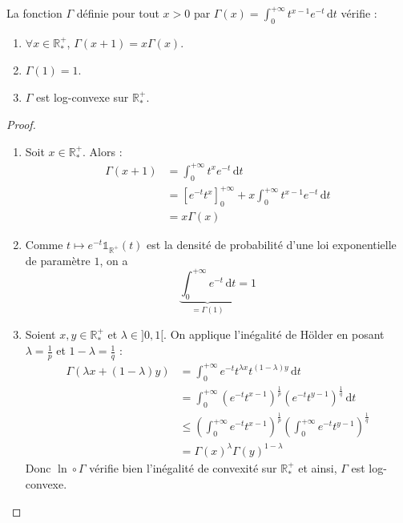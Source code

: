 






	\begin{lemma}
		\label{caracterisation-reelle-de-gamma-1}
		La fonction $\Gamma$ définie pour tout $x > 0$ par $\Gamma(x) = \int_0^{+\infty} t^{x-1} e^{-t} \, \mathrm{d}t$ vérifie :
		\begin{enumerate}[label=(\roman*)]
			\item \label{caracterisation-reelle-de-gamma-2} $\forall x \in \mathbb{R}^+_*$, $\Gamma(x+1) = x\Gamma(x)$.
			\item \label{caracterisation-reelle-de-gamma-3} $\Gamma(1) = 1$.
			\item \label{caracterisation-reelle-de-gamma-4} $\Gamma$ est log-convexe sur $\mathbb{R}^+_*$.
		\end{enumerate}
	\end{lemma}

	\begin{proof}
		\begin{enumerate}[label=(\roman*)]
			\item Soit $x \in \mathbb{R}^+_*$. Alors :
			\begin{align*}
				\Gamma(x+1) &= \int_0^{+\infty} t^x e^{-t} \, \mathrm{d}t \\
				&= \left[ e^{-t} t^x \right]_0^{+\infty} + x \int_0^{+\infty} t^{x-1} e^{-t} \, \mathrm{d}t \\
				&= x\Gamma(x)
			\end{align*}
			\item Comme $t \mapsto e^{-t} \mathbb{1}_{\mathbb{R}^+}(t)$ est la densité de probabilité d'une loi exponentielle de paramètre $1$, on a
			\[ \underbrace{\int_0^{+\infty} e^{-t} \, \mathrm{d}t}_{= \Gamma(1)} = 1 \]
			\item Soient $x, y \in \mathbb{R}^+_*$ et $\lambda \in ]0, 1[$. On applique l'inégalité de Hölder en posant $\lambda = \frac{1}{p}$ et $1-\lambda = \frac{1}{q}$ :
			\begin{align*}
				\Gamma(\lambda x + (1-\lambda) y) &= \int_0^{+\infty} e^{-t} t^{\lambda x} t^{(1-\lambda)y} \, \mathrm{d}t \\
				&= \int_0^{+\infty} (e^{-t} t^{x-1})^{\frac{1}{p}} (e^{-t} t^{y-1})^{\frac{1}{q}} \, \mathrm{d}t \\
				&\leq \left (\int_0^{+\infty} e^{-t} t^{x-1} \right)^{\frac{1}{p}} \left (\int_0^{+\infty} e^{-t} t^{y-1} \right)^{\frac{1}{q}} \\
				&= \Gamma(x)^\lambda \Gamma(y)^{1-\lambda}
			\end{align*}
			Donc $\ln \circ \Gamma$ vérifie bien l'inégalité de convexité sur $\mathbb{R}^+_*$ et ainsi, $\Gamma$ est log-convexe.
		\end{enumerate}
	\end{proof}

